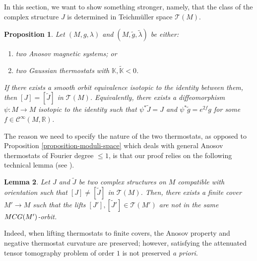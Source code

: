 \documentclass[reqno,12pt,letterpaper]{amsart}
\newtheorem{proposition}{Proposition}[section]
\newtheorem{lemma}[proposition]{Lemma}
\theoremstyle{definition}
\theoremstyle{remark}
\theoremstyle{definition}
\numberwithin{equation}{section}
\newcommand{\R}{\mathbb{R}}
\begin{document}
In this section, we want to show something stronger, namely, that the class of the complex structure $J$ is determined in Teichmüller space $\mathcal{T}(M)$.

\begin{proposition}\label{proposition:same-teichmuller-class}
Let $(M, g, \lambda)$ and $(M, \tilde{g}, \tilde{\lambda})$ be either:
\begin{enumerate}
\item[(a)] two Anosov magnetic systems; or
\item[(b)] two Gaussian thermostats with $\mathbb{K}, \widetilde{\mathbb{K}}<0$.
\end{enumerate}
If there exists a smooth orbit equivalence isotopic to the identity between them, then $[J]=[\widetilde{J}]$ in $\mathcal{T}(M)$. Equivalently, there exists a diffeomorphism $\psi : M\to M$ isotopic to the identity such that $\psi^*\widetilde{J}=J$ and $\psi^*\tilde{g}=e^{2f}g$ for some $f\in \mathcal{C}^\infty(M,\R)$. 
\end{proposition}

The reason we need to specify the nature of the two thermostats, as opposed to Proposition \ref{proposition-moduli-space} which deals with general Anosov thermostats of Fourier degree $\leq 1$, is that our proof relies on the following technical lemma (see \cite[Lemma 3.8]{guillarmou25}).
\begin{lemma}\label{lemma-finite-cover}
Let $J$ and $\widetilde{J}$ be two complex structures on $M$ compatible with orientation such that $[J]\neq[\widetilde{J}]$ in $\mathcal{T}(M)$. Then, there exists a finite cover $M'\to M$ such that the lifts $[J'],[\widetilde{J}']\in \mathcal{T}(M')$ are not in the same $\textup{MCG}(M')$-orbit. 
\end{lemma}

Indeed, when lifting thermostats to finite covers, the Anosov property and negative thermostat curvature are preserved; however, satisfying the attenuated tensor tomography problem of order $1$ is not preserved \textit{a priori}.
\end{document}
